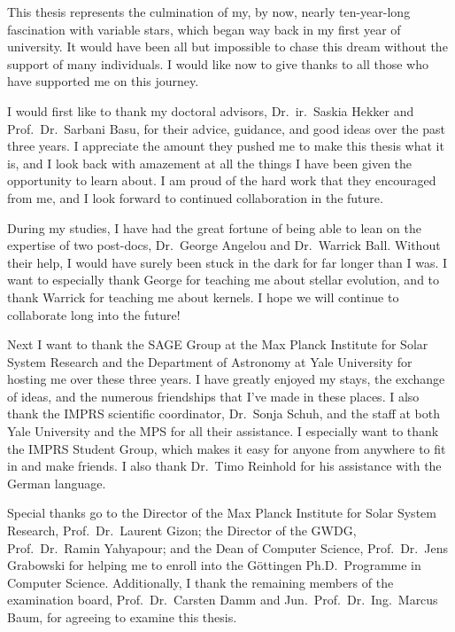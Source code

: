 This thesis represents the culmination of my, by now, nearly ten-year-long fascination with variable stars, which began way back in my first year of university. 
It would have been all but impossible to chase this dream without the support of many individuals. 
I would like now to give thanks to all those who have supported me on this journey. 

I would first like to thank my doctoral advisors, Dr.\ ir.\ Saskia Hekker and Prof.\ Dr.\ Sarbani Basu, for their advice, guidance, and good ideas over the past three years. 
I appreciate the amount they pushed me to make this thesis what it is, and I look back with amazement at all the things I have been given the opportunity to learn about. 
I am proud of the hard work that they encouraged from me, and I look forward to continued collaboration in the future. 

During my studies, I have had the great fortune of being able to lean on the expertise of two post-docs, Dr.\ George Angelou and Dr.\ Warrick Ball. 
Without their help, I would have surely been stuck in the dark for far longer than I was. 
I want to especially thank George for teaching me about stellar evolution, and to thank Warrick for teaching me about kernels. 
I hope we will continue to collaborate long into the future! 

Next I want to thank the SAGE Group at the Max Planck Institute for Solar System Research and the Department of Astronomy at Yale University for hosting me over these three years. 
I have greatly enjoyed my stays, the exchange of ideas, and the numerous friendships that I've made in these places. 
I also thank the IMPRS scientific coordinator, Dr.\ Sonja Schuh, and the staff at both Yale University and the MPS for all their assistance. 
I especially want to thank the IMPRS Student Group, which makes it easy for anyone from anywhere to fit in and make friends. 
I also thank Dr.\ Timo Reinhold for his assistance with the German language. 

Special thanks go to the Director of the Max Planck Institute for Solar System Research, Prof.\ Dr.\ Laurent Gizon; the Director of the GWDG, Prof.\ Dr.\ Ramin Yahyapour; and the Dean of Computer Science, Prof.\ Dr.\ Jens Grabowski for helping me to enroll into the 
G\"ottingen Ph.D.\ Programme in Computer Science. 
Additionally, I thank the remaining members of the examination board, Prof.\ Dr.\ Carsten Damm and Jun.\ Prof.\ Dr.\ Ing.\ Marcus Baum, for agreeing to examine this thesis. 


